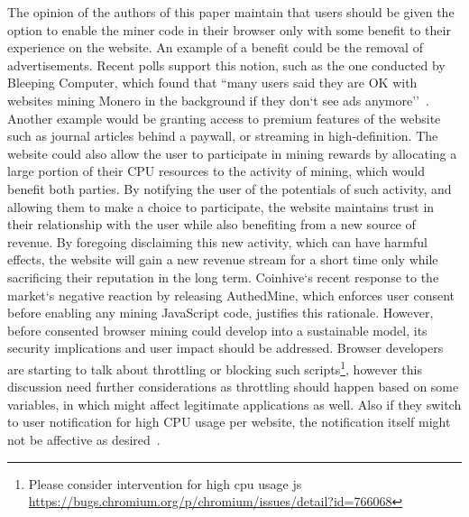 The opinion of the authors of this paper maintain that users should be given the option to enable the miner code in their browser only with some benefit to their experience on the website.  An example of a benefit could be the removal of advertisements. Recent polls support this notion, such as the one conducted by Bleeping Computer, which found that ``many users said they are OK with websites mining Monero in the background if they don`t see ads anymore''~\cite{bleepingcomputerminers}. Another example would be granting access to premium features of the website such as journal articles behind a paywall, or streaming in high-definition. The website could also allow the user to participate in mining rewards by allocating a large portion of their CPU resources to the activity of mining, which would benefit both parties. By notifying the user of the potentials of such activity, and allowing them to make a choice to participate, the website maintains trust in their relationship with the user while also benefiting from a new source of revenue. By foregoing disclaiming this new activity, which can have harmful effects, the website will gain a new revenue stream for a short time only while sacrificing their reputation in the long term. Coinhive`s recent response to the market`s negative reaction by releasing AuthedMine, which enforces user consent before enabling any mining JavaScript code, justifies this rationale. However, before consented browser mining could develop into a sustainable model, its security implications and user impact should be addressed.
Browser developers are starting to talk about throttling or blocking such scripts\footnote{Please consider intervention for high cpu usage js \url{https://bugs.chromium.org/p/chromium/issues/detail?id=766068}}, however this discussion need further considerations as throttling should happen based on some variables, in which might affect legitimate applications as well. Also if they switch to user notification for high CPU usage per website, the notification itself might not be affective as desired~\cite{SHB11}\cite{SEAAC09}.

